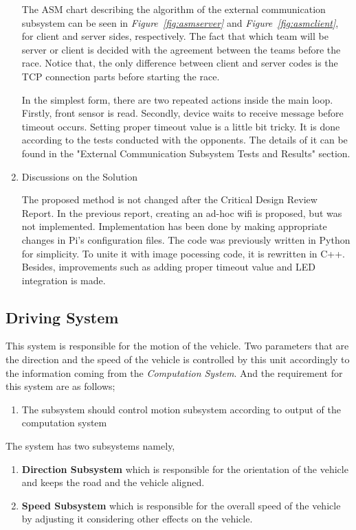 \documentclass[a4paper,12pt]{article}
\begin{document}
\begin{enumerate}
	
	The ASM chart describing the algorithm of the external communication subsystem can be seen in \textit{Figure~\ref{fig:asmserver}} and \textit{Figure~\ref{fig:asmclient}}, for client and server sides, respectively. The fact that which team will be server or client is decided with the agreement between the teams before the race. Notice that, the only difference between client and server codes is the TCP connection parts before starting the race. 
	
	In the simplest form, there are two repeated actions inside the main loop. Firstly, front sensor is read. Secondly, device waits to receive message before timeout occurs. Setting proper timeout value is a little bit tricky. It is done according to the tests conducted with the opponents. The details of it can be found in the "External Communication Subsystem Tests and Results" section.
	
	
	\item {Discussions on the Solution}
	
	The proposed method is not changed after the Critical Design Review Report. In the previous report, creating an ad-hoc wifi is proposed, but was not implemented. Implementation has been done by making appropriate changes in Pi's configuration files. The code was previously written in Python for simplicity. To unite it with image pocessing code, it is rewritten in C++. Besides, improvements such as adding proper timeout value and LED integration is made.
\end{enumerate}




\subsection{Driving System}

	This system is responsible for the motion of the vehicle. Two parameters that are the direction and the speed of the vehicle is controlled by this unit accordingly to the information coming from the \textit{Computation System}. And the requirement for this system are as follows;


	\begin{enumerate}
		\item The subsystem should control motion subsystem according to output of the computation system		
	\end{enumerate}

	The system has two subsystems namely,
		
	\begin{enumerate}
		\item \textbf{Direction Subsystem} which is responsible for the orientation of the vehicle and keeps the road and the vehicle aligned.
		\item \textbf{Speed Subsystem} which is responsible for the overall speed of the vehicle by adjusting it considering other effects on the vehicle.
	\end{enumerate}
\end{document}

